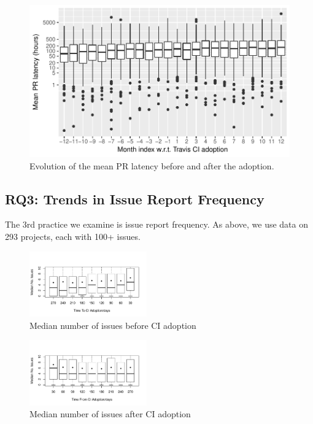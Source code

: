 \begin{figure}[t]
\centering
\includegraphics[width=\columnwidth, clip=true, trim=0 0 0 0]{figures/pr-latency-mean.pdf}
\caption{Evolution of the mean PR latency before and after the \Tvis adoption.}
\label{fig:pr-latency}
\end{figure}







\subsection{RQ3: Trends in Issue Report Frequency}

The 3rd practice we examine is issue report frequency.
As above, we use data on 293 projects, each with 
100+ issues.

\begin{figure}[t]
\centering
\includegraphics[width=0.45\textwidth, clip=true, trim=0 15 15 50]{issues_before.pdf}
\caption{Median number of issues before CI adoption}
\label{Fig:IssuesBefore}
\end{figure}


\begin{figure}[t]
\centering
\includegraphics[width=0.45\textwidth, clip=true, trim=0 15 15 50]{issues_after.pdf}
\caption{Median number of issues after CI adoption}
\label{Fig:IssuesAfter}
\end{figure}

